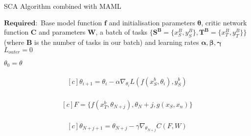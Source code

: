 \documentclass{article} \usepackage[dvipsnames]{xcolor}
\begin{document}
\begin{algorithm}
\caption{SCA Algorithm combined with MAML \label{alg:full}}
\begin{algorithmic}[1]
\State $\mathbf{Required:}$ Base model function $\mathbf{f}$ and initialisation parameters $\boldsymbol{\theta}$, critic network function  $\mathbf{C}$ and parameters $\mathbf{W}$, a batch of tasks $\{\mathbf{S^{B}} = \{x_{S}^{B}, y_{S}^{B}\}, \mathbf{T^{B}} = \{x_{T}^{B}, y_{T}^{B}\}\}$ (where $\mathbf{B}$ is the number of tasks in our batch) and learning rates $\mathbf{\alpha, \beta, \gamma}$
\State $L_{outer} = 0$

\State $\theta_0 = \theta$ 
 
\State \vspace*{-\baselineskip} \begin{fleqn} 
        \setlength\belowdisplayskip{0pt}
        \begin{gather} \label{equation:inner_support_update}
            \begin{multlined}[c]
                \theta_{i+1} = \theta_{i} - \alpha \nabla_{\theta_{i}} L(f(x_S^b, \theta_{i}), y_S^b)
            \end{multlined}
        \end{gather}
\end{fleqn}
\EndFor


\State \vspace*{-\baselineskip} \begin{fleqn} 
        \setlength\belowdisplayskip{0pt}
        \begin{gather} \label{equation:critic_features}
            \begin{multlined}[c]
                F = \{f(x_T^b, \theta_{N+j}), \theta_N+j, g(x_S, x_n)\}
            \end{multlined}
        \end{gather}
        \end{fleqn}
\State \vspace*{-\baselineskip} \begin{fleqn} 
        \setlength\belowdisplayskip{0pt}
        \begin{gather} \label{equation:inner_target_update}
            \begin{multlined}[c]
                \theta_{N+j+1} = \theta_{N+j} - \gamma \nabla_{\theta_{N+j}} C(F, W)
            \end{multlined}
        \end{gather}
\end{fleqn}
\EndFor


\end{algorithmic}
\end{algorithm}
\end{document}
